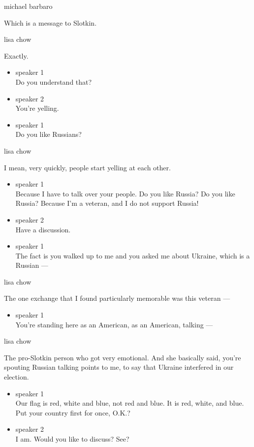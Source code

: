 michael barbaro

Which is a message to Slotkin.

lisa chow

Exactly.

\begin{itemize}
\item
  speaker 1\\
  Do you understand that?
\item
  speaker 2\\
  You're yelling.
\item
  speaker 1\\
  Do you like Russians?
\end{itemize}

lisa chow

I mean, very quickly, people start yelling at each other.

\begin{itemize}
\item
  speaker 1\\
  Because I have to talk over your people. Do you like Russia? Do you
  like Russia? Because I'm a veteran, and I do not support Russia!
\item
  speaker 2\\
  Have a discussion.
\item
  speaker 1\\
  The fact is you walked up to me and you asked me about Ukraine, which
  is a Russian ---
\end{itemize}

lisa chow

The one exchange that I found particularly memorable was this veteran
---

\begin{itemize}
\tightlist
\item
  speaker 1\\
  You're standing here as an American, as an American, talking ---
\end{itemize}

lisa chow

The pro-Slotkin person who got very emotional. And she basically said,
you're spouting Russian talking points to me, to say that Ukraine
interfered in our election.

\begin{itemize}
\item
  speaker 1\\
  Our flag is red, white and blue, not red and blue. It is red, white,
  and blue. Put your country first for once, O.K.?
\item
  speaker 2\\
  I am. Would you like to discuss? See?
\end{itemize}

